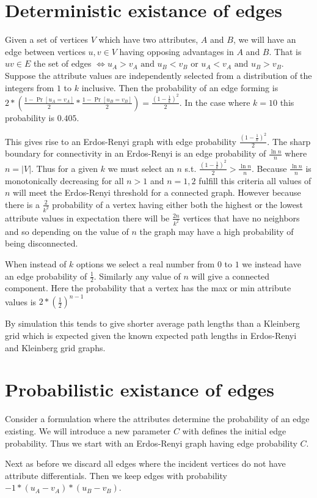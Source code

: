 \documentclass{article}
\begin{document}
\section{Deterministic existance of edges}

Given a set of vertices $V$ which have two attributes, $A$ and $B$, we will have an edge between vertices $u, v \in V$ having opposing advantages in $A$ and $B$.
That is $uv \in E$ the set of edges $\iff u_A > v_A \text{ and } u_B < v_B$
or $u_A < v_A \text{ and } u_B > v_B$.
Suppose the attribute values are independently selected from a distribution of the integers from $1$ to $k$ inclusive.
Then the probability of an edge forming is $2 * (\frac{1 - \Pr[u_A = v_A]}{2} * \frac{1 - \Pr[u_B = v_B]}{2}) = \frac{(1 - \frac1k)^2}{2}$.
In the case where $k = 10$ this probability is $0.405$.

This gives rise to an Erdos-Renyi graph with edge probability $\frac{(1 - \frac1k)^2}{2}$.
The sharp boundary for connectivity in an Erdos-Renyi is an edge probability of $\frac{\ln n}{n}$ where $n = |V|$.
Thus for a given $k$ we must select an $n$ s.t. $\frac{(1 - \frac1k)^2}{2} > \frac{\ln n}{n}$.
Because $\frac{\ln n}{n}$ is monotonically decreasing for all $n > 1$ and $n = 1, 2$ fulfill this criteria all values of $n$ will meet the Erdos-Renyi threshold for a connected graph.
However because there is a $\frac{2}{k^2}$ probability of a vertex having either both the highest or the lowest attribute values in expectation there will be $\frac{2n}{k^2}$ vertices that have no neighbors and so depending on the value of $n$ the graph may have a high probability of being disconnected.

When instead of $k$ options we select a real number from $0$ to $1$ we instead have an edge probability of $\frac12$. Similarly any value of $n$ will give a connected component.
Here the probability that a vertex has the max or min attribute values is $2*(\frac12)^{n-1}$

By simulation this tends to give shorter average path lengths than a Kleinberg grid which is expected given the known expected path lengths in Erdos-Renyi and Kleinberg grid graphs.

\section{Probabilistic existance of edges}

Consider a formulation where the attributes determine the probability of an edge existing.
We will introduce a new parameter $C$ with defines the initial edge probability.
Thus we start with an Erdos-Renyi graph having edge probability $C$.

Next as before we discard all edges where the incident vertices do not have attribute differentials.
Then we keep edges with probability $-1 * (u_A - v_A) * (u_B - v_B)$. %
\end{document}
